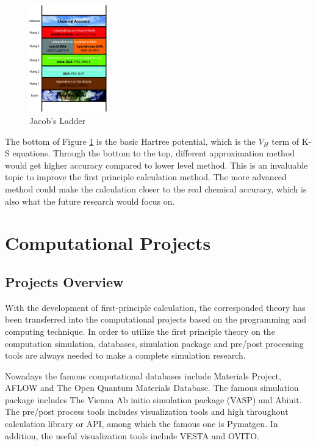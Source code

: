 \documentclass[letterpaper,12pt]{article}
\begin{document}
\begin{figure}[ht]
\centering
\includegraphics[width=0.3\textwidth]{./images/JoacbLadder.jpg}
\caption{\label{jacobladder}Jacob's Ladder\cite{luintroduction}}
\end{figure}

The bottom of Figure \ref{jacobladder} is the basic Hartree potential, which is the $V_{H}$ term of K-S equations. Through the bottom to the top, different approximation method would get higher accuracy compared to lower level method. This is an invaluable topic to improve the first principle calculation method. The more advanced method could make the calculation closer to the real chemical accuracy, which is also what the future research would focus on. 

\section{Computational Projects}

\subsection{Projects Overview}

With the development of first-principle calculation, the corresponded theory has been transferred into the computational projects based on the programming and computing technique. In order to utilize the first principle theory on the computation simulation, databases, simulation package and pre/post processing tools are always needed to make a complete simulation research.\\
\par Nowadays the famous computational databases include Materials Project\cite{jain2013commentary}, AFLOW\cite{curtarolo2012aflow} and The Open Quantum Materials Database\cite{saal2013materials}. The famous simulation package includes The Vienna Ab initio simulation package (VASP)\cite{hafner2008ab}\cite{kresse1996software} and Abinit\cite{gonze2005brief}. The pre/post process tools includes visualization tools and high throughout calculation library or API, among which the famous one is Pymatgen\cite{ong2013python}. In addition, the useful visualization tools include VESTA\cite{momma2011vesta} and OVITO\cite{stukowski2009visualization}.
\end{document}
